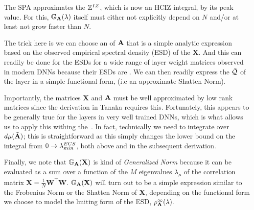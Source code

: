 The SPA approximates the \PartitionFunction $\mathbb{Z}^{IZ}$, which is now an HCIZ integral,  by its peak value.
For this, $\mathbb{G}_{\mathbf{A}}(\lambda)$ itself must either not explicitly depend on $N$ and/or at least not grow faster than $N$.

The trick here is we can choose an \RTransform of $\mathbf{\mathbf{A}}$
that is a simple analytic expression based on the observed
empirical spectral density (ESD) of the $\mathbf{X}$.
And this can readily be done for the ESDs for a wide range of layer weight matrices
observed in modern DNNs because their ESDs are \HeavyTailed \PowerLaw\cite{MM19_HTSR_ICML}.
We can then readily express the \Quality $\bar{\mathcal{Q}}$ of the \Teacher
layer in a simple functional form, (i.e  an approximate Shatten Norm).

Importantly, the matrices $\mathbf{X}$  and $\mathbf{\mathbf{A}}$ must be well approximated
by low rank matrices since the derivation in Tanaka requires this.  Fortunately,
this appears to be generally true for the layers in very well trained DNNs,
which is what allows us to apply this withing the~\ECS.
In fact, technically we need to integrate over $d\mu(\tilde{\mathbf{A}})$; this is straightforward
as this simply changes the lower bound on the integral from $0\rightarrow\lambda^{ECS}_{min}$,
both above and in the subsequent derivation.

Finally, we note that $\mathbb{G}_{\mathbf{A}}(\mathbf{X})$ is kind of \emph{Generalized Norm} because 
it can be evaluated as a sum over a function of the $M$ eigenvalues $\lambda_{\mu}$ of the \Teacher
correlation matrix $\mathbf{X}=\frac{1}{N}\mathbf{W}^{\top}\mathbf{W}$.
$\mathbb{G}_{\mathbf{A}}(\mathbf{X})$  will turn out to be a simple expression similar to the Frobenius Norm or the
Shatten Norm of $\mathbf{X}$, depending on the functional form we choose to model the
lmiting form of the \Student ESD, $\rho_{\mathbf{A}}^{\infty}(\lambda)$.

